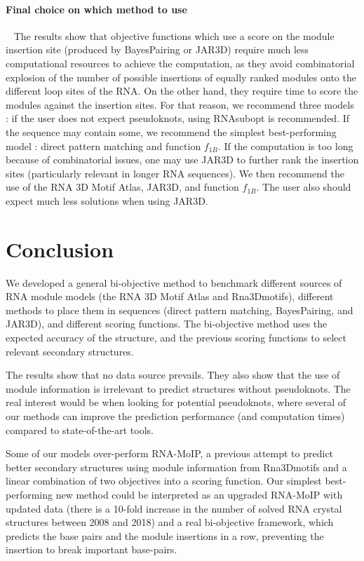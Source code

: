 \documentclass{bioinfo}
\begin{document}
\paragraph{Final choice on which method to use}\label{sec:recommend} ~
The results show that objective functions which use a score on the module insertion site (produced by BayesPairing or JAR3D) require much less computational resources to achieve the computation, as they avoid combinatorial explosion of the number of possible insertions of equally ranked modules onto the different loop sites of the RNA.
On the other hand, they require time to score the modules against the insertion sites.
For that reason, we recommend three models : if the user does not expect pseudoknots, using RNAsubopt is recommended. If the sequence may contain some, we recommend the simplest best-performing model : direct pattern matching and function $f_{1B}$. If the computation is too long because of combinatorial issues, one may use JAR3D to further rank the insertion sites (particularly relevant in longer RNA sequences). We then recommend the use of the RNA 3D Motif Atlas, JAR3D, and function $f_{1B}$. The user also should expect much less solutions when using JAR3D.


\section{Conclusion}
We developed a general bi-objective method to benchmark different sources of RNA module models (the RNA 3D Motif Atlas and Rna3Dmotifs), different methods to place them in sequences (direct pattern matching, BayesPairing, and JAR3D), and different scoring functions. The bi-objective method uses the expected accuracy of the structure, and the previous scoring functions to select relevant secondary structures.
   
The results show that no data source prevails. They also show that the use of module information is irrelevant to predict structures without pseudoknots. 
The real interest would be when looking for potential pseudoknots, where several of our methods can improve the prediction performance (and computation times) compared to state-of-the-art tools.

Some of our models over-perform RNA-MoIP, a previous attempt to predict better secondary structures using module information from Rna3Dmotifs and a linear combination of two objectives into a scoring function. Our simplest best-performing new method could be interpreted as an upgraded RNA-MoIP with updated data (there is a 10-fold increase in the number of solved RNA crystal structures between 2008 and 2018) and a real bi-objective framework, which predicts the base pairs and the module insertions in a row, preventing the insertion to break important base-pairs.
\end{document}
